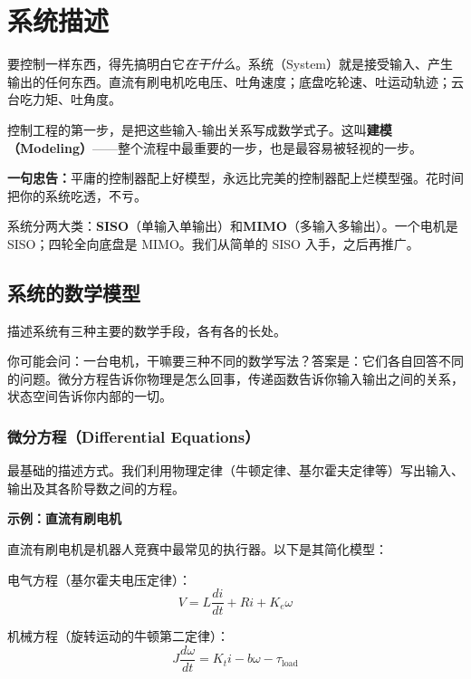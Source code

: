 \section{系统描述}

要控制一样东西，得先搞明白它\textit{在干什么}。系统（System）就是接受输入、产生输出的任何东西。直流有刷电机吃电压、吐角速度；底盘吃轮速、吐运动轨迹；云台吃力矩、吐角度。

控制工程的第一步，是把这些输入-输出关系写成数学式子。这叫\textbf{建模（Modeling）}——整个流程中最重要的一步，也是最容易被轻视的一步。

\textbf{一句忠告：}平庸的控制器配上好模型，永远比完美的控制器配上烂模型强。花时间把你的系统吃透，不亏。

系统分两大类：\textbf{SISO}（单输入单输出）和\textbf{MIMO}（多输入多输出）。一个电机是 SISO；四轮全向底盘是 MIMO。我们从简单的 SISO 入手，之后再推广。

\subsection{系统的数学模型}

描述系统有三种主要的数学手段，各有各的长处。

你可能会问：一台电机，干嘛要三种不同的数学写法？答案是：它们各自回答不同的问题。微分方程告诉你物理是怎么回事，传递函数告诉你输入输出之间的关系，状态空间告诉你内部的一切。

\subsubsection{微分方程（Differential Equations）}

最基础的描述方式。我们利用物理定律（牛顿定律、基尔霍夫定律等）写出输入、输出及其各阶导数之间的方程。

\textbf{示例：直流有刷电机}

直流有刷电机是机器人竞赛中最常见的执行器。以下是其简化模型：

电气方程（基尔霍夫电压定律）：
\begin{equation}
V = L \frac{di}{dt} + Ri + K_e \omega
\end{equation}

机械方程（旋转运动的牛顿第二定律）：
\begin{equation}
J \frac{d\omega}{dt} = K_t i - b\omega - \tau_{\text{load}}
\end{equation}


